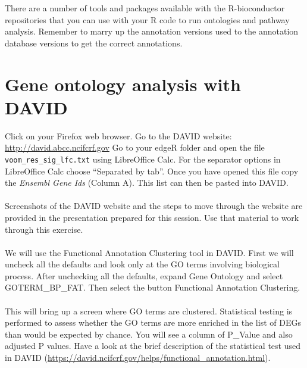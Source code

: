 \begin{Statistical tests used in Gene Ontology analysis}[style=multiline,labelindent=0cm,align=left,leftmargin=0.5cm]
\begin{note}
There are a number of tools and packages available with the R-bioconductor repositories that you can use with your R code to run ontologies and pathway analysis. Remember to marry up the annotation versions used to the annotation database versions to get the correct annotations.
\end{note}

\section{Gene ontology analysis with DAVID}

Click on your Firefox web browser.  Go to the DAVID website: \url{http://david.abcc.ncifcrf.gov}
Go to your edgeR folder and open the file \texttt{voom_res_sig_lfc.txt} using LibreOffice Calc. For the separator options in LibreOffice Calc choose “Separated by tab”. Once you have opened this file copy the \emph{Ensembl Gene Ids} (Column A). This list can then be pasted into DAVID.\\\\

Screenshots of the DAVID website and the steps to move through the website are provided in the presentation prepared for this session. Use that material to work through this exercise.\\\\

We will use the Functional Annotation Clustering tool in DAVID. First we will uncheck all the defaults and look only at the GO terms involving biological process. After unchecking all the defaults, expand Gene Ontology and select GOTERM_BP_FAT. Then select the button Functional Annotation Clustering. \\\\

This will bring up a screen where GO terms are clustered.  Statistical testing is performed to assess whether the GO terms are more enriched in the list of DEGs than would be expected by chance. You will see a column of P_Value and also adjusted P values.  Have a look at the brief description of the statistical test used in DAVID (\url{https://david.ncifcrf.gov/helps/functional_annotation.html}).


\end{Statistical tests used in Gene Ontology analysis}
